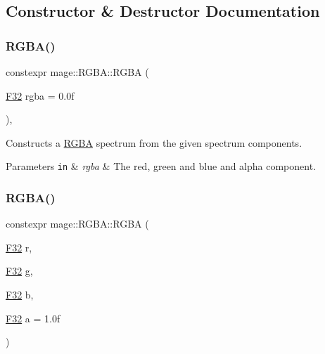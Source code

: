 \subsection{Constructor \& Destructor Documentation}
\mbox{\label{structmage_1_1_r_g_b_a_afe334e4408a71e808b8cf0bc9dd06dde}} 
\subsubsection{\texorpdfstring{R\+G\+B\+A()}{RGBA()}\hspace{0.1cm}{\footnotesize\ttfamily [1/8]}}
{\footnotesize\ttfamily constexpr mage\+::\+R\+G\+B\+A\+::\+R\+G\+BA (\begin{DoxyParamCaption}\item[{\mbox{\hyperlink{namespacemage_aa97e833b45f06d60a0a9c4fc22ae02c0}{F32}}}]{rgba = {\ttfamily 0.0f} }\end{DoxyParamCaption})\hspace{0.3cm}{\ttfamily [explicit]}, {\ttfamily [noexcept]}}

Constructs a \mbox{\hyperlink{structmage_1_1_r_g_b_a}{R\+G\+BA}} spectrum from the given spectrum components.


\begin{DoxyParams}[1]{Parameters}
\mbox{\tt in}  & {\em rgba} & The red, green and blue and alpha component. \\
\hline
\end{DoxyParams}
\mbox{\label{structmage_1_1_r_g_b_a_a12ae339b8bcae0a1c0aacad280963ade}} 
\subsubsection{\texorpdfstring{R\+G\+B\+A()}{RGBA()}\hspace{0.1cm}{\footnotesize\ttfamily [2/8]}}
{\footnotesize\ttfamily constexpr mage\+::\+R\+G\+B\+A\+::\+R\+G\+BA (\begin{DoxyParamCaption}\item[{\mbox{\hyperlink{namespacemage_aa97e833b45f06d60a0a9c4fc22ae02c0}{F32}}}]{r,  }\item[{\mbox{\hyperlink{namespacemage_aa97e833b45f06d60a0a9c4fc22ae02c0}{F32}}}]{g,  }\item[{\mbox{\hyperlink{namespacemage_aa97e833b45f06d60a0a9c4fc22ae02c0}{F32}}}]{b,  }\item[{\mbox{\hyperlink{namespacemage_aa97e833b45f06d60a0a9c4fc22ae02c0}{F32}}}]{a = {\ttfamily 1.0f} }\end{DoxyParamCaption})\hspace{0.3cm}{\ttfamily [noexcept]}}

